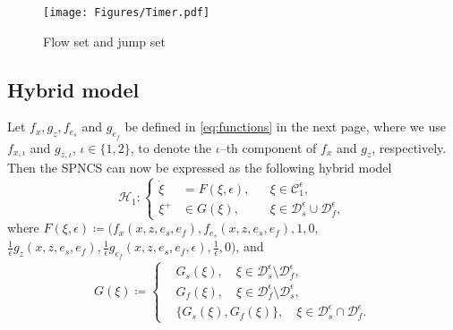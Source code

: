 \begin{figure}[H]
    \centering
    \texttt{[image: Figures/Timer.pdf]}
    \caption{Flow set and jump set}
    \label{fig: Stefan timer}
\end{figure} 












\subsection{Hybrid model}
Let $f_x,g_z,f_{e_s}$ and $g_{e_f}$ be defined in \eqref{eq:functions} in the next page, where we use $f_{x,\iota}$ and $g_{z,\iota}$, $\iota\in\{1,2\}$, to denote the $\iota$--th component of $f_x  $ and $g_z$, respectively.
%
%
Then the SPNCS can now be expressed as the following hybrid model
\begin{equation}
    \mathcal{H}_1:\left\{
\begin{aligned}
    \dot{\xi} &= F(\xi, \epsilon), &&\xi \in \mathcal{C}_1^\epsilon, \\
    \xi^+ &\in G(\xi),  &&\xi\in \mathcal{D}_s^\epsilon \cup \mathcal{D}_f^\epsilon,
\end{aligned}
    \right.
    \label{eqn:full system}
\end{equation}
where 
$F(\xi, \epsilon) \coloneqq  \big(f_x(x,z,e_s,e_f),f_{e_s}(x,z,e_s,e_f),1,0, $ $\tfrac{1}{\epsilon}g_z(x,z,e_s,e_f), \tfrac{1}{\epsilon} g_{e_f}(x,z,e_s,e_f, \epsilon),  \frac{1}{\epsilon},0\big)$, and 
\begin{align*}
    G(\xi) \coloneqq \left\{ 
    \begin{aligned}
    &G_s(\xi), \quad \xi\in\mathcal{D}_s^\epsilon \setminus \mathcal{D}_f^\epsilon , \\
    &G_f(\xi), \quad \xi\in\mathcal{D}_f^\epsilon \setminus \mathcal{D}_s^\epsilon ,\\
    &\{G_s(\xi),G_f(\xi)\},\quad \xi\in \mathcal{D}_s^\epsilon\cap\mathcal{D}_f^\epsilon .
    \end{aligned}
    \right. 
\end{align*}
